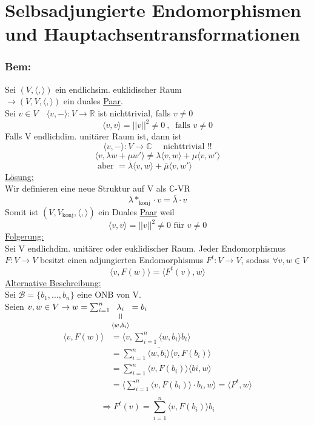 \documentclass[titlepage,12pt,a4paper,ngerman]{report}
\newcommand{\verteq}{\rotatebox{90}{$\,=$}}
\newcommand{\equalto}[2]{\underset{\scriptstyle\overset{\mkern4mu\verteq}{#2}}{#1}}
\newcommand{\tx}[1]{\textrm{#1}}
\begin{document}
\section{Selbsadjungierte Endomorphismen\\ und Hauptachsentransformationen}
\subsubsection{Bem:}
Sei $ (V, \langle , \rangle) $ ein endlichsim. euklidischer Raum\\
$ \rightarrow (V,V,\langle,\rangle)$ ein duales \underline{Paar}.\\
Sei $ v\in V \quad \langle v, - \rangle : V \to \mathbb{R} $ ist nichttrivial, falls $ v \neq 0 $
$$ \langle v,v \rangle = ||v||^2 \neq 0\ , \ \tx{ falls } v \neq 0$$
Falls V endlichdim. unitärer Raum ist, dann ist 
$$ \langle v,-\rangle : V \to \mathbb{C} \quad \tx{ nichttrivial !!} $$
$$ \langle v, \lambda w + \mu w' \rangle \neq \lambda \langle v,w \rangle + \mu \langle v, w' \rangle$$
$$ \tx{aber } = \overline{\lambda} \langle v,w \rangle + \overline{\mu} \langle v, w'\rangle \qquad \quad $$
\underline{Lösung:}\\
Wir definieren eine neue Struktur auf V als $ \mathbb{C} $-VR
$$ \lambda *_{\tx{konj}} \cdot v = \overline{\lambda} \cdot v $$
Somit ist $ (V,V_{\tx{konj}}, \langle,\rangle) $ ein Duales \underline{Paar} weil 
$$ \langle v,v \rangle = ||v||^2 \neq 0 \tx{ für } v \neq 0$$
\underline{Folgerung:}\\
Sei V endlichdim. unitärer oder euklidischer Raum. Jeder Endomorphismus $ F: V \to V $ besitzt einen adjungierten Endomorphismus $ F^t: V \to V $, sodass $ \forall v,w \in V  $\\
$$ \langle v, F(w)\rangle = \langle F^t(v) , w \rangle$$
\underline{Alternative Beschreibung:}\\
Sei $ \mathcal{B}= \{b_1,\dots , b_n  \} $ eine ONB von V.\\
Seien $ v,w \in V \rightarrow w = \sum_{i=1}^{n} \equalto{\lambda _i}{\langle w, b_i \rangle} = b_i $
\begin{align*}
\langle v, F(w) \rangle &= \langle v , \sum_{i=1}^{n} \langle w, b_i \rangle b_i \rangle\\
&= \sum_{i=1}^{n} \overline{ \langle w, b_i \rangle } \langle v, F(b_i) \rangle \\
&= \sum_{i=1}^{n} \langle v, F(b_i) \rangle \langle bi , w \rangle\\
&= \langle \sum_{i=1}^{n} \langle v, F(b_i)\rangle \cdot b_i , w \rangle = \langle F^t, w \rangle\\
\end{align*}
$$ \Rightarrow F^t(v) = \sum_{i=1}^{n} \langle v, F(b_i)\rangle b_i$$
\end{document}
